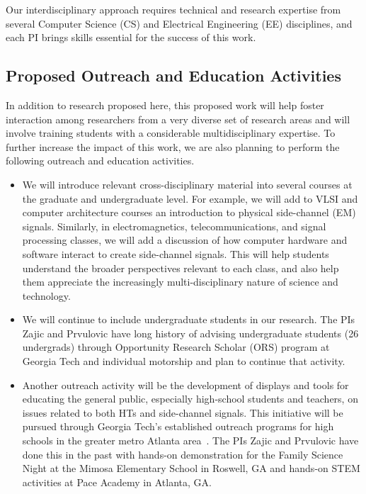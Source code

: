 \documentclass[11 pt]{article}
\def\denseitems{
  \itemsep1pt plus1pt minus1pt
  \parsep0pt plus0pt
  \parskip0pt
  \topsep0pt
}
\begin{document}
Our interdisciplinary approach requires technical and research
expertise from several Computer Science (CS) and Electrical Engineering (EE) disciplines, and each PI brings skills essential for the success of this work.



\subsection{Proposed Outreach and Education Activities}

In addition to research proposed here, this proposed work will help foster interaction among researchers from a
very diverse set of research areas and will involve training students
with a considerable multidisciplinary expertise. To further increase
the impact of this work, we are also planning to perform the following
outreach and education activities.

\begin{itemize}\denseitems

\item We will introduce relevant cross-disciplinary material into
  several courses at the graduate and undergraduate level. For
  example, we will add to VLSI and computer
  architecture courses an introduction to physical side-channel (EM)
  signals. Similarly, in electromagnetics, telecommunications, and
  signal processing classes, we will add a discussion of how computer
  hardware and software interact to create side-channel signals. This
  will help students understand the broader perspectives relevant to
  each class, and also help them appreciate the increasingly
  multi-disciplinary nature of science and technology.

\item We will continue to include undergraduate students in our
  research. The PIs Zajic and Prvulovic have long history of advising undergraduate students (26 undergrads) through
  Opportunity Research Scholar (ORS) program at Georgia Tech and individual motorship and plan to continue that activity.

\item Another outreach activity will be the development of displays
  and tools for educating the general public, especially high-school
  students and teachers, on issues related to both HTs and side-channel signals. This initiative will be
  pursued through Georgia Tech’s established outreach programs for
  high schools in the greater metro Atlanta area~\cite{Conrad2022}.
  The PIs Zajic and Prvulovic have done this in the past with hands-on demonstration for the Family Science Night at the Mimosa
  Elementary School in Roswell, GA and hands-on STEM activities at Pace Academy in Atlanta, GA.
\end{itemize}
\end{document}

